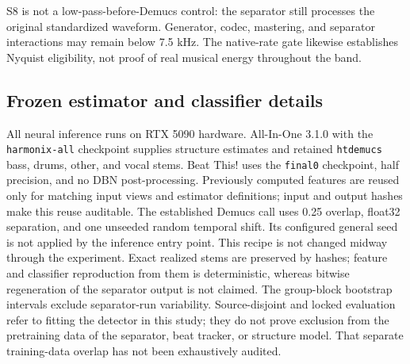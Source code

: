 S8 is not a low-pass-before-Demucs control: the separator still processes the
original standardized waveform. Generator, codec, mastering, and separator
interactions may remain below 7.5 kHz. The native-rate gate likewise establishes
Nyquist eligibility, not proof of real musical energy throughout the band.

\subsection{Frozen estimator and classifier details}

All neural inference runs on RTX 5090 hardware. All-In-One 3.1.0 with the
\texttt{harmonix-all} checkpoint supplies structure estimates and retained
\texttt{htdemucs} bass, drums, other, and vocal stems. Beat This! uses the
\texttt{final0} checkpoint, half precision, and no DBN post-processing.
Previously computed features are reused only for matching input views and
estimator definitions; input and output hashes make this reuse auditable.
The established Demucs call uses 0.25 overlap, float32 separation, and one
unseeded random temporal shift. Its configured general seed is not applied by the
inference entry point. This recipe is not changed midway through the experiment.
Exact realized stems are preserved by hashes; feature and classifier reproduction
from them is deterministic, whereas bitwise regeneration of the separator output
is not claimed. The group-block bootstrap intervals exclude separator-run variability.
Source-disjoint and locked evaluation refer to fitting the detector in this study;
they do not prove exclusion from the pretraining data of the separator, beat
tracker, or structure model. That separate training-data overlap has not been
exhaustively audited.

